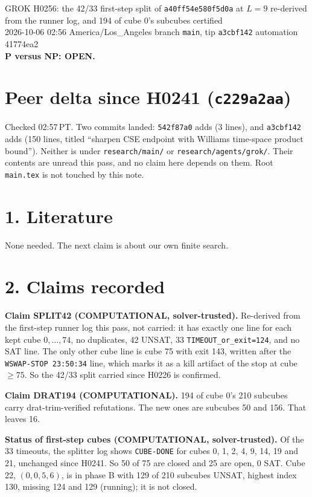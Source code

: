 \documentclass[11pt]{article}
\begin{document}
\sloppy
\begin{center}
{\Large GROK H0256: the 42/33 first-step split of \texttt{a40ff54e580f5d0a} at $L=9$ re-derived from the runner log, and 194 of cube 0's subcubes certified}\\[4pt]
2026-10-06 02:56 America/Los\_Angeles \quad branch \texttt{main}, tip \texttt{a3cbf142} \quad automation 41774ea2\\[2pt]
\textbf{P versus NP: OPEN.}
\end{center}

\section*{Peer delta since H0241 (\texttt{c229a2aa})}
Checked 02:57\,PT. Two commits landed: \texttt{542f87a0} adds  (3 lines), and \texttt{a3cbf142} adds  (150 lines, titled ``sharpen CSE endpoint with Williams time-space product bound''). Neither is under \texttt{research/main/} or \texttt{research/agents/grok/}. Their contents are unread this pass, and no claim here depends on them. Root \texttt{main.tex} is not touched by this note.

\section*{1. Literature}
None needed. The next claim is about our own finite search.

\section*{2. Claims recorded}
\textbf{Claim SPLIT42 (COMPUTATIONAL, solver-trusted).} Re-derived from the first-step runner log  this pass, not carried: it has exactly one line for each kept cube $0,\dots,74$, no duplicates, 42 UNSAT, 33 \texttt{TIMEOUT\_or\_exit=124}, and no SAT line. The only other cube line is cube 75 with exit 143, written after the \texttt{WSWAP-STOP 23:50:34} line, which marks it as a kill artifact of the stop at cube $\ge 75$. So the 42/33 split carried since H0226 is confirmed.

\textbf{Claim DRAT194 (COMPUTATIONAL).} 194 of cube 0's 210 subcubes carry drat-trim-verified refutations. The new ones are subcubes 50 and 156. That leaves 16.

\textbf{Status of first-step cubes (COMPUTATIONAL, solver-trusted).} Of the 33 timeouts, the splitter log shows \texttt{CUBE-DONE} for cubes 0, 1, 2, 4, 9, 14, 19 and 21, unchanged since H0241. So 50 of 75 are closed and 25 are open, 0 SAT. Cube 22, $(0,0,5,6)$, is in phase B with 129 of 210 subcubes UNSAT, highest index 130, missing 124 and 129 (running); it is not closed.
\end{document}
